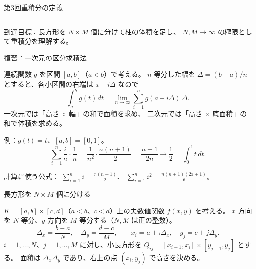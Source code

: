 \documentclass[a4paper,10pt,pdflatex,ja=standard,jafont=ipaex-type1,
  magstyle=real,scale=1]{bxjsarticle}
\newcommand{\handoutnumber}{3}
\newcommand{\handouttitle}[1]{%
  \begin{center}
    {\Large\color{ink}#1}\par\vspace{3mm}
    {\color{accent}\rule{0.88\linewidth}{0.7pt}}
  \end{center}\vspace{-2mm}}
\newcommand{\handout}[2]{%
  \renewcommand{\handoutnumber}{#1}%
  \handouttitle{第#1回\quad #2}}
\newcommand{\topic}[1]{\par\vspace{5pt}%
  {\large\sffamily\mdseries\color{accent}#1}\par\vspace{2pt}}
\newcommand{\keybox}[1]{\par\vspace{3pt}\begingroup
  \setlength{\fboxsep}{4pt}%
  \colorbox{soft}{\parbox{\dimexpr\linewidth-2\fboxsep\relax}{\small #1}}%
  \endgroup\par\vspace{2pt}}
\newcommand{\examplelabel}[1]{{\sffamily\mdseries\color{ink}#1}}
\begin{document}
\fontsize{10pt}{13.5pt}\selectfont
\setlength{\abovedisplayskip}{4pt}
\setlength{\belowdisplayskip}{4pt}
\handout{3}{重積分の定義}
\keybox{到達目標：長方形を $N\times M$ 個に分けて柱の体積を足し、
$N,M\to\infty$ の極限として重積分を理解する。}

\topic{復習：一次元の区分求積法}
連続関数 $g$ を区間 $[a,b]$（$a<b$）で考える。
$n$ 等分した幅を $\Delta=(b-a)/n$ とすると、各小区間の右端は $a+i\Delta$ なので
$$
 \int_a^b g(t)\,dt
 =\lim_{n\to\infty}\sum_{i=1}^n g(a+i\Delta)\,\Delta.
$$
一次元では「高さ $\times$ 幅」の和で面積を求め、
二次元では「高さ $\times$ 底面積」の和で体積を求める。

\examplelabel{例：$g(t)=t$、$[a,b]=[0,1]$。}
$$
 \sum_{i=1}^n\frac in\cdot\frac1n
 =\frac1{n^2}\cdot\frac{n(n+1)}2
 =\frac{n+1}{2n}\longrightarrow\frac12
 =\int_0^1 t\,dt.
$$
\keybox{計算に使う公式：
$\displaystyle\sum_{i=1}^n i=\frac{n(n+1)}2$、\quad
$\displaystyle\sum_{i=1}^n i^2=\frac{n(n+1)(2n+1)}6$。}

\topic{長方形を $N\times M$ 個に分ける}
$K=[a,b]\times[c,d]$（$a<b$、$c<d$）上の実数値関数 $f(x,y)$ を考える。
$x$ 方向を $N$ 等分、$y$ 方向を $M$ 等分する（$N,M$ は正の整数）。
$$
 \Delta_x=\frac{b-a}{N},\quad \Delta_y=\frac{d-c}{M},\qquad
 x_i=a+i\Delta_x,\quad y_j=c+j\Delta_y.
$$
$i=1,\ldots,N$、$j=1,\ldots,M$ に対し、小長方形を
$Q_{ij}=[x_{i-1},x_i]\times[y_{j-1},y_j]$ とする。
面積は $\Delta_x\Delta_y$ であり、右上の点 $(x_i,y_j)$ で高さを決める。
\end{document}
